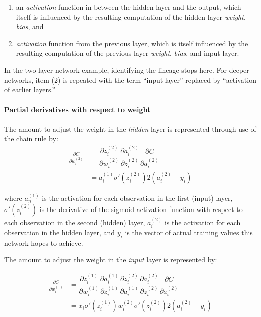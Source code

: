\begin{enumerate}
\tightlist
\item
  an \textit{activation} function in between the hidden layer and the output,
  which itself is influenced by the resulting computation of the hidden layer \emph{weight}, \emph{bias}, and
\item
  \textit{activation} function from the previous layer, which is itself
  influenced by the resulting computation of the previous layer
  \emph{weight}, \emph{bias}, and input layer.
\end{enumerate}

In the two-layer network example, identifying the lineage stops here.  For deeper networks, item (2) is repeated with the term ``input layer'' replaced by ``activation of earlier layers.''



\hypertarget{partial-derivatives-with-respect-to-weight}{%
\paragraph{Partial derivatives with respect to
weight}\label{partial-derivatives-with-respect-to-weight}}

The amount to adjust the weight in the \emph{hidden} layer is
represented through use of the chain rule by:
\begin{align*}
\frac{\partial{C}}{\partial{w_i^{(2)}}}    &=  \dfrac{\partial{z_i^{(2)}}}{\partial{w_i^{(2)}}}
     \dfrac{\partial{a_i^{(2)}}}{\partial{z_i^{(2)}}}
     \dfrac{\partial{C}}{\partial{a_i^{(2)}}} \\ 
 &= a_i^{(1)} \sigma'(z_i^{(2)}) 2(a_i^{(2)}-y_i) \end{align*}

where \(a_n^{(1)}\) is the activation for each observation in the first
(input) layer, \(\sigma'(z_i^{(2)})\) is the derivative of the sigmoid
activation function with respect to each observation in the second
(hidden) layer, \(a_i^{(2)}\) is the activation for each observation in
the hidden layer, and \(y_i\) is the vector of actual training values
this network hopes to achieve.

The amount to adjust the weight in the \emph{input} layer is
represented by:

    \begin{align*}
\frac{\partial{C}}{\partial{w_i^{(1)}}}    &= \dfrac{\partial{z_i^{(1)}}}{\partial{w_i^{(1)}}} \dfrac{\partial{a_i^{(1)}}}{\partial{z_i^{(1)}}}  \dfrac{\partial{z_i^{(2)}}}{\partial{a_i^{(1)}}}
     \dfrac{\partial{a_i^{(2)}}}{\partial{z_i^{(2)}}}
     \dfrac{\partial{C}}{\partial{a_i^{(2)}}} \\    
&= x_i \sigma'(z_i^{(1)}) w_i^{(2)} \sigma'(z_i^{(2)}) 2(a_i^{(2)}-y_i) \\
     \end{align*}

